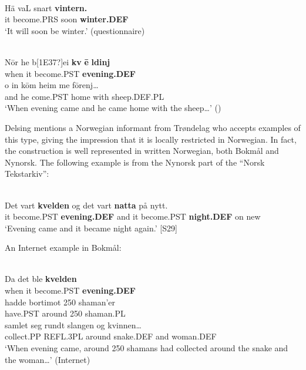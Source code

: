 \ea \label{} 
\\
\gll Hä  vaL  snart  \textbf{vintern.}\\
it  become.PRS  soon  \textbf{winter.DEF}\\
\glt ‘It will soon be winter.’ (questionnaire)

\z

\ea \label{} 
\\
\gll N\=or  he  b[1E37?]ei  \textbf{kv} \textbf{\=e} \textbf{ldinj}\\
when  it  become.PST  \textbf{evening.DEF}\\
\gll o  in  k\=om  heim  me  f\=orenj…\\
and  he  come.PST  home  with  sheep.DEF.PL\\
\glt ‘When evening came and he came home with the sheep…’ (\citet[38]{Lundell1936})

\z

Delsing mentions a Norwegian informant from Trøndelag who accepts examples of this type, giving the impression that it is locally restricted in Norwegian. In fact, the construction is well represented in written Norwegian, both Bokmål and Nynorsk. The following example is from the Nynorsk part of the “Norsk Tekstarkiv”: 

\ea \label{} 
\\
\gll Det vart  \textbf{kvelden} og  det  vart  \textbf{natta} på  nytt.\\ %
it  become.PST  \textbf{evening.DEF} and  it  become.PST  \textbf{night.DEF} on  new\\
\glt ‘Evening came and it became night again.’ [S29]

\z

An Internet example in Bokmål: 


\ea \label{} 
\\
\gll Da  det  ble  \textbf{kvelden} \\
when  it  become.PST  \textbf{evening.DEF} \\
\gll hadde  bortimot  250  shaman’er\\
have.PST  around  250  shaman.PL\\
\gll samlet  seg  rundt  slangen  og  kvinnen…\\
collect.PP  REFL.3PL  around  snake.DEF  and  woman.DEF\\
\glt ‘When evening came, around 250 shamans had collected around the snake and the woman…’ (Internet)

